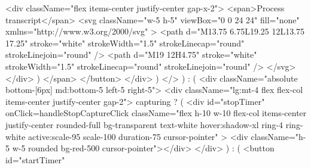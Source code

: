 {{{{{{{{                                      <div className="flex items-center justify-center gap-x-2">
                                        <span>Process transcript</span>
                                        <svg
                                          className="w-5 h-5"
                                          viewBox="0 0 24 24"
                                          fill="none"
                                          xmlns="http://www.w3.org/2000/svg"
                                        >
                                          <path
                                            d="M13.75 6.75L19.25 12L13.75 17.25"
                                            stroke="white"
                                            strokeWidth="1.5"
                                            strokeLinecap="round"
                                            strokeLinejoin="round"
                                          />
                                          <path
                                            d="M19 12H4.75"
                                            stroke="white"
                                            strokeWidth="1.5"
                                            strokeLinecap="round"
                                            strokeLinejoin="round"
                                          />
                                        </svg>
                                      </div>
                                    )}
                                  </span>
                                </button>
                              </div>
                            )}
                          </>
                        ) : (
                          <div className="absolute bottom-[6px] md:bottom-5 left-5 right-5">
                            <div className="lg:mt-4 flex flex-col items-center justify-center gap-2">
                              {capturing ? (
                                <div
                                  id="stopTimer"
                                  onClick={handleStopCaptureClick}
                                  className="flex h-10 w-10 flex-col items-center justify-center rounded-full bg-transparent text-white hover:shadow-xl ring-4 ring-white  active:scale-95 scale-100 duration-75 cursor-pointer"
                                >
                                  <div className="h-5 w-5 rounded bg-red-500 cursor-pointer"></div>
                                </div>
                              ) : (
                                <button
                                  id="startTimer"
}}}}}}}
